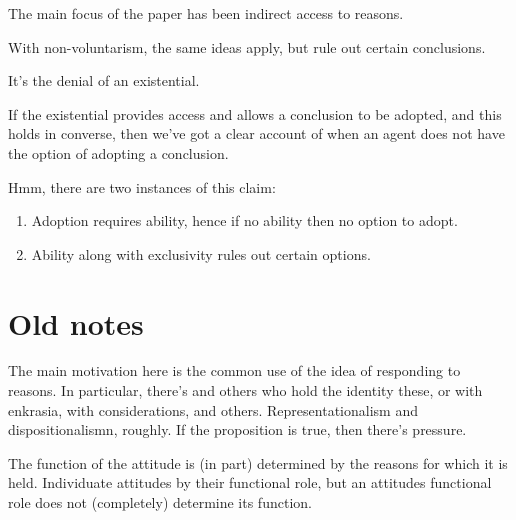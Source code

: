 \documentclass[10pt]{article}
\begin{document}
The main focus of the paper has been indirect access to reasons.

With non-voluntarism, the same ideas apply, but rule out certain conclusions.

It's the denial of an existential.

If the existential provides access and allows a conclusion to be adopted, and this holds in converse, then we've got a clear account of when an agent does not have the option of adopting a conclusion.

Hmm, there are two instances of this claim:
\begin{enumerate}
\item Adoption requires ability, hence if no ability then no option to adopt.
\item Ability along with exclusivity rules out certain options.
\end{enumerate}



\newpage

\printbibliography


\newpage

\section{Old notes}
\label{sec:old-notes}

The main motivation here is the common use of the idea of responding to reasons.
In particular, there's \citeauthor{Lord:2018aa} and others who hold the identity these, or \citeauthor{Broome:2013aa} with enkrasia, \citeauthor{Hieronymi:2018aa} with considerations, and others.
Representationalism and dispositionalismn, roughly.
If the proposition is true, then there's pressure.

\begin{note}
  The function of the attitude is (in part) determined by the reasons for which it is held.
  Individuate attitudes by their functional role, but an attitudes functional role does not (completely) determine its function.
\end{note}
\end{document}
